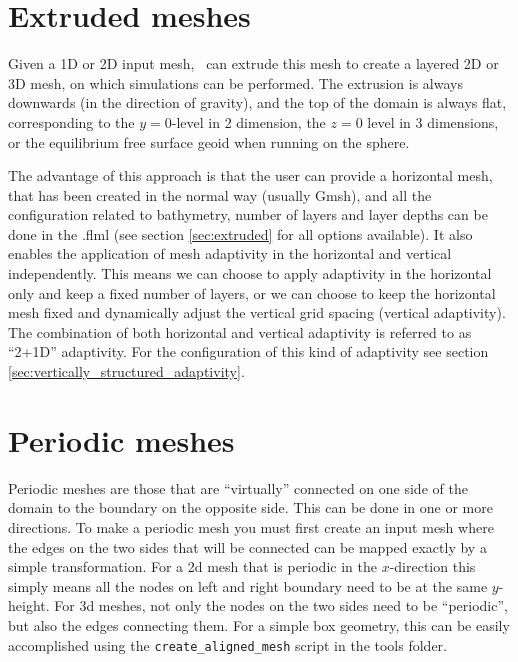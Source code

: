 \section{Extruded meshes}
\label{sec:extruded_meshes}

Given a 1D or 2D input mesh, \fluidity\ can extrude this
mesh to create a layered 2D or 3D mesh, on which simulations can be
performed. The extrusion is always downwards (in the direction of gravity), 
and the top of the domain is always flat, corresponding to the $y=0$-level 
in 2 dimension, the $z=0$ level in 3 dimensions, or the equilibrium 
free surface geoid when running on the sphere.

The advantage of this approach is that the user can provide a horizontal mesh,
that has been created in the normal way (usually Gmsh), and all the
configuration related to bathymetry, number of layers and layer depths can be
done in the .flml (see section \ref{sec:extruded} for all options available). It also
enables the application of mesh adaptivity in the horizontal and vertical
independently. This means we can choose to apply adaptivity in the horizontal
only and keep a fixed number of layers, or we can choose to keep the horizontal
mesh fixed and dynamically adjust the vertical grid spacing (vertical
adaptivity). The combination of both horizontal and vertical adaptivity is
referred to as ``2+1D'' adaptivity. For the configuration of this kind of
adaptivity see section \ref{sec:vertically_structured_adaptivity}.

\section{Periodic meshes}
\label{sec:periodic_meshes}
Periodic meshes are those that are ``virtually'' connected on one side of the
domain to the boundary on the opposite side. This can be done in one or more
directions. To make a periodic
mesh you must first create an input mesh where the edges on the two sides
that will be connected
can be mapped exactly by a simple transformation. For a 2d mesh that is 
periodic in the $x$-direction this simply means all the nodes on left and right
boundary need to be at the same $y$-height. For 3d meshes, not only the nodes
on the two sides need to be ``periodic'', but also the edges connecting them.
For a simple box geometry, this can be easily accomplished using the
\lstinline[language=Bash]+create_aligned_mesh+ script in the tools folder.

